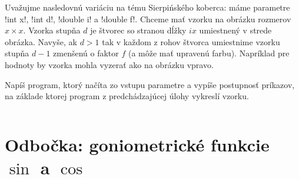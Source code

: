   \begin{column}{0.65}
\begin{uloha}
  Uvažujme nasledovnú variáciu na tému Sierpińského koberca: máme parametre
  \prg!int x!, \prg!int d!,
  \prg!double i! a \prg!double f!. Chceme mať vzorku na obrázku rozmerov $x\times x$.
  Vzorka stupňa $d$  je štvorec so stranou dĺžky $ix$ umiestnený v strede obrázka.
  Navyše, ak $d>1$ tak v každom z rohov štvorca umiestnime vzorku stupňa $d-1$
  zmenšenú o faktor $f$ (a môže mať upravenú farbu). Napríklad pre
  hodnoty  by vzorka mohla vyzerať ako na obrázku vpravo.
  
  Napíš program, ktorý načíta zo vstupu parametre  a vypíše postupnosť príkazov,
  na základe ktorej program z predchádzajúcej úlohy vykreslí 
  vzorku.
\end{uloha}
\end{column}\hfill\begin{column}{0.3}
  {\setlength{\fboxsep}{0pt}
  \centerline{}
  }
\end{column}  


\section*{Odbočka: goniometrické funkcie $\sin$ a $\cos$}
\label{sect:sin_cos}

